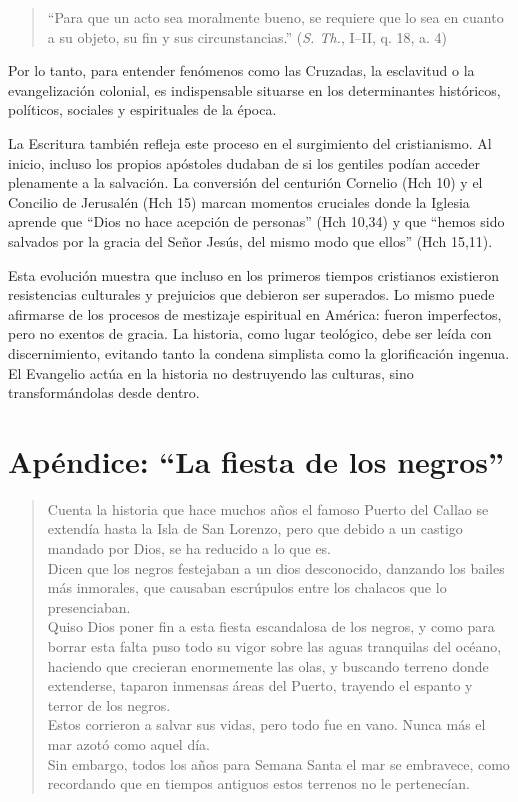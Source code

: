 \documentclass[a4paper,12pt]{article}
\begin{document}
	\begin{quote}
		“Para que un acto sea moralmente bueno, se requiere que lo sea en cuanto a su objeto, su fin y sus circunstancias.” (\textit{S. Th.}, I–II, q. 18, a. 4)
	\end{quote}
	
	 Por lo tanto, para entender fenómenos como las Cruzadas, la esclavitud o la evangelización colonial, es indispensable situarse en los determinantes históricos, políticos, sociales y espirituales de la época.
	
	La Escritura también refleja este proceso en el surgimiento del cristianismo. Al inicio, incluso los propios apóstoles dudaban de si los gentiles podían acceder plenamente a la salvación. La conversión del centurión Cornelio (Hch 10) y el Concilio de Jerusalén (Hch 15) marcan momentos cruciales donde la Iglesia aprende que “Dios no hace acepción de personas” (Hch 10,34) y que “hemos sido salvados por la gracia del Señor Jesús, del mismo modo que ellos” (Hch 15,11).
	
	Esta evolución muestra que incluso en los primeros tiempos cristianos existieron resistencias culturales y prejuicios que debieron ser superados. Lo mismo puede afirmarse de los procesos de mestizaje espiritual en América: fueron imperfectos, pero no exentos de gracia. La historia, como lugar teológico, debe ser leída con discernimiento, evitando tanto la condena simplista como la glorificación ingenua. El Evangelio actúa en la historia no destruyendo las culturas, sino transformándolas desde dentro.
	
\appendix
\section*{Apéndice: “La fiesta de los negros”}

\begin{quote}
	
	Cuenta la historia que hace muchos años el famoso Puerto del Callao se extendía hasta la Isla de San Lorenzo, pero que debido a un castigo mandado por Dios, se ha reducido a lo que es.\\
	
	Dicen que los negros festejaban a un dios desconocido, danzando los bailes más inmorales, que causaban escrúpulos entre los chalacos que lo presenciaban.\\
	
	Quiso Dios poner fin a esta fiesta escandalosa de los negros, y como para borrar esta falta puso todo su vigor sobre las aguas tranquilas del océano, haciendo que crecieran enormemente las olas, y buscando terreno donde extenderse, taparon inmensas áreas del Puerto, trayendo el espanto y terror de los negros.\\
	
	Estos corrieron a salvar sus vidas, pero todo fue en vano. Nunca más el mar azotó como aquel día.\\
	
	Sin embargo, todos los años para Semana Santa el mar se embravece, como recordando que en tiempos antiguos estos terrenos no le pertenecían.
\end{quote}
\end{document}
